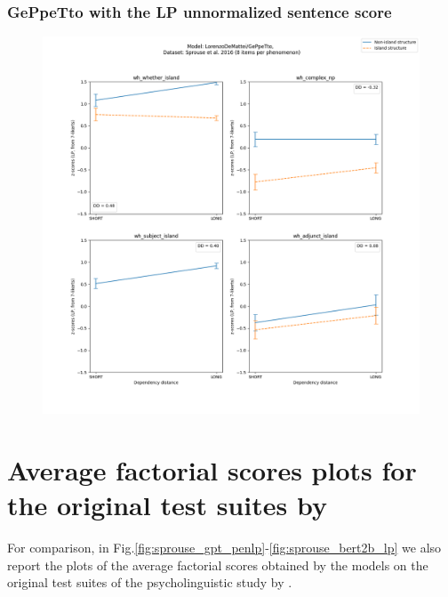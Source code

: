 \subsubsection{GePpeTto with the LP unnormalized sentence score}
\begin{figure}[h]
	\centering
	\includegraphics[width=1\textwidth]{images/AppendixA/Sprouse_wh_LorenzoDeMattei_GePpeTto_LP-zscores-likert-2022-09-14_h17m23s51.png} 
	\label{A-fig:sprouse_gpt_lp}
	\caption{}
\end{figure}

\clearpage
\section{Average factorial scores plots for the original test suites by \citet{sprouse2016experimental}}

For comparison, in Fig.\ref{fig:sprouse_gpt_penlp}-\ref{fig:sprouse_bert2b_lp} we also report the plots of the average factorial scores obtained by the models on the original test suites of the psycholinguistic study by \citet{sprouse2016experimental}.

